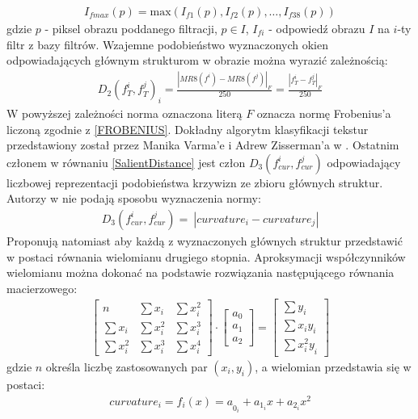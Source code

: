\documentclass[12pt, twoside, openany]{report}
\theoremstyle{definition}
\begin{document}
\begin{align}
I_{fmax}(p)=\mathrm{max}\mathrm{}(I_{f1}(p),I_{f2}(p),\dots ,I_{f38}(p))
\end{align}
gdzie $p$ - piksel obrazu poddanego filtracji, $p\in I$, $I_{fi}$ - odpowiedź obrazu $I$ na $i$-ty filtr z bazy filtrów. Wzajemne podobieństwo wyznaczonych okien odpowiadających głównym strukturom w obrazie można wyrazić zależnością:
\begin{align}
D_2{\left(f^i_T,f^j_T\right)}_i=\frac{{\left|MR8\left(f^i\right)-MR8\left(f^j\right)\right|}_F}{250}=\frac{{\left|f^i_T-f^j_T\right|}_F}{250}
\end{align}
W powyższej zależności norma oznaczona literą $F$ oznacza normę Frobenius'a liczoną zgodnie z \eqref{FROBENIUS}.
Dokładny algorytm klasyfikacji tekstur przedstawiony został przez Manika Varma'e i Adrew Zisserman'a w \cite{varma2009statistical}. Ostatnim członem w równaniu \eqref{SalientDistance} jest człon $D_3\left(f^i_{cur},f^j_{cur}\right)$ odpowiadający liczbowej reprezentacji podobieństwa krzywizn ze zbioru głównych struktur. Autorzy w \cite{SalientStrucTexProp} nie podają sposobu wyznaczenia normy:
\begin{align}
D_3\left(f^i_{cur},f^j_{cur}\right)=\ \left|curvature_i-curvature_j\right|
\end{align}
Proponują natomiast aby każdą z wyznaczonych głównych struktur przedstawić w postaci równania wielomianu drugiego stopnia. Aproksymacji współczynników wielomianu można dokonać na podstawie rozwiązania następującego równania macierzowego:
\begin{align}
\left[ \begin{array}{ccc}
n & \sum{x_i} & \sum{x^2_i} \\ 
\sum{x_i} & \sum{x^2_i} & \sum{x^3_i} \\ 
\sum{x^2_i} & \sum{x^3_i} & \sum{x^4_i} \end{array}
\right]\cdot \left[ \begin{array}{c}
a_0 \\ 
a_1 \\ 
a_2 \end{array}
\right]=\left[ \begin{array}{c}
\sum{y_i} \\ 
\sum{x_iy_i} \\ 
\sum{{x^2_iy}_i} \end{array}
\right]
\end{align}
gdzie $n$ określa liczbę zastosowanych par $(x_i,y_i)$, a wielomian przedstawia się w postaci:
\begin{align}
curvature_i={f_i\left(x\right)=a}_{0_i}+a_{1_i}x+a_{2_i}x^2
\end{align}
\end{document}

